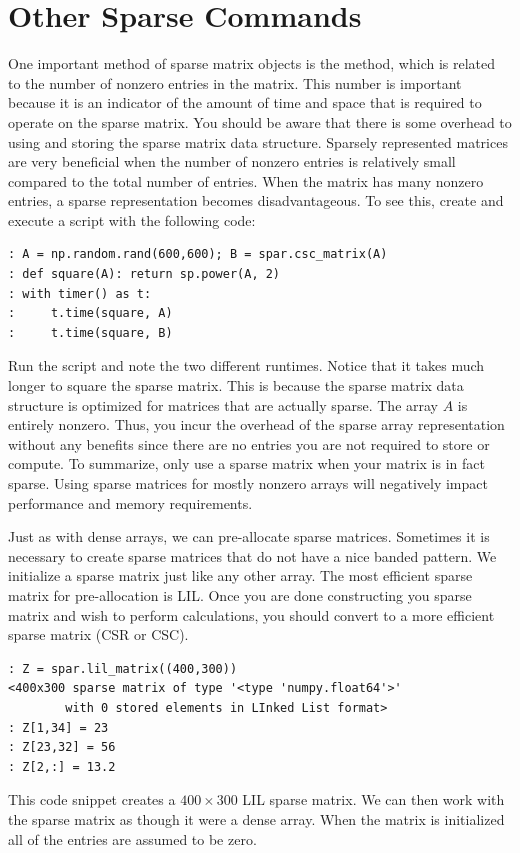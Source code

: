 \section*{Other Sparse Commands}
One important method of sparse matrix objects is the  method, 
which is related to the number of nonzero entries in the matrix.  
This number is important because it is an indicator of the amount of time and space
that is required to operate on the sparse matrix. 
You should be aware that there is some overhead to using and storing the sparse matrix data structure. 
Sparsely represented matrices are very beneficial when the number of 
nonzero entries is relatively small compared to the total number of entries. 
When the matrix has many nonzero entries, a sparse representation becomes disadvantageous. 
To see this, create and execute a script with the following code:
\begin{lstlisting}
: A = np.random.rand(600,600); B = spar.csc_matrix(A)
: def square(A): return sp.power(A, 2)
: with timer() as t:
:     t.time(square, A)
:     t.time(square, B)
\end{lstlisting}
Run the script and note the two different runtimes. 
Notice that it takes much longer to square the sparse matrix.
This is because the sparse matrix data structure is optimized for matrices that are actually sparse.
The array $A$ is entirely nonzero. 
Thus, you incur the overhead of the sparse array representation without any 
benefits since there are no entries you are not required to store or compute.
To summarize, only use a sparse matrix when your matrix is in fact sparse. 
Using sparse matrices for mostly nonzero arrays will negatively impact performance and memory requirements.

Just as with dense arrays, we can pre-allocate sparse matrices.
Sometimes it is necessary to create sparse matrices that do not have a nice banded pattern. 
We initialize a sparse matrix just like any other array.  
The most efficient sparse matrix for pre-allocation is LIL.  
Once you are done constructing you sparse matrix and wish to perform calculations, 
you should convert to a more efficient sparse matrix (CSR or CSC).
\begin{lstlisting}
: Z = spar.lil_matrix((400,300))
<400x300 sparse matrix of type '<type 'numpy.float64'>'
        with 0 stored elements in LInked List format>
: Z[1,34] = 23
: Z[23,32] = 56
: Z[2,:] = 13.2
\end{lstlisting}
This code snippet creates a $400 \times 300$ LIL sparse matrix. 
We can then work with the sparse matrix as though it were a dense array. 
When the matrix is initialized all of the entries are assumed to be zero.